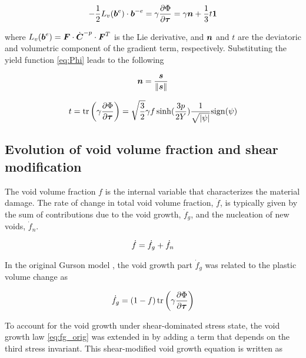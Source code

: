 \begin{equation}\label{eq:flowRule}
-\frac{1}{2}L_v({\boldsymbol{b}}^e)\cdot{\boldsymbol{b}}^{-e} =
\gamma\frac{\partial\Phi}{\partial{\boldsymbol{\tau}}}=\gamma{\boldsymbol{n}} +
\frac{1}{3}t\boldsymbol{1}
\end{equation}

where $L_v({\boldsymbol{b}}^e)={\boldsymbol{F}} \cdot \dot{{\boldsymbol{C}}}^{-p} \cdot {\boldsymbol{F}}^T$ is the Lie
derivative, and ${\boldsymbol{n}}$ and $t$ are the deviatoric and volumetric
component of the gradient term, respectively. Substituting the yield
function \eqref{eq:Phi} leads to the following

\begin{equation}\label{eq:n}
{\boldsymbol{n}} = \frac{{\boldsymbol{s}}}{\|{\boldsymbol{s}}\|}
\end{equation}

\begin{equation}\label{eq:t}
t = \operatorname{\text{tr}} \left( \gamma \frac{\partial\Phi}{\partial{\boldsymbol{\tau}}}\right) =
\sqrt{\frac{3}{2}}\gamma f \sinh (\frac{3p}{2
  Y})\frac{1}{\sqrt{|\psi|}} {\rm sign}(\psi)
\end{equation}


\subsection{Evolution of void volume fraction and shear modification}
The void volume fraction $f$ is the internal variable that
characterizes the material damage. The rate of change in total void
volume fraction, $\dot{f}$, is typically given by the sum of
contributions due to the void growth, $\dot{f}_g$, and the nucleation
of new voids, $\dot{f}_{n}$.

\begin{equation}\label{eq:dotf}
\dot{f} = \dot{f}_g + \dot{f}_{n}\\
\end{equation}

In the original Gurson model \cite{Gurson1977}, the void growth part
$\dot{f}_g$ was related to the plastic volume change as

\begin{equation}\label{eq:fg_orig}
\dot{f}_g = (1-f)\operatorname{\text{tr}}\left( \gamma\frac{\partial\Phi}{\partial{\boldsymbol{\tau}}}
\right)
\end{equation}

To account for the void growth under shear-dominated stress state, 
the void growth law \eqref{eq:fg_orig} was extended in
\cite{Nahshon2008} by adding a term that depends on the third stress 
invariant. This shear-modified void growth equation is written as

